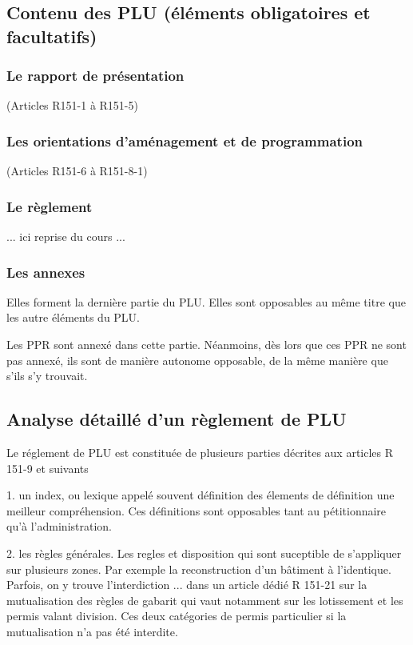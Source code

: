 	\subsection{Contenu des PLU (éléments obligatoires et facultatifs)}
	
		\subsubsection{Le rapport de présentation} (Articles R151-1 à R151-5)
		
		
		\subsubsection{Les orientations d'aménagement et de programmation} 
		(Articles R151-6 à R151-8-1)
		
		\subsubsection{Le règlement} 
		
		... ici reprise du cours ...
		
		\subsubsection{Les annexes}
		
		Elles forment la dernière partie du PLU. Elles sont opposables au même titre que les autre éléments du PLU.
		
		Les PPR sont annexé dans cette partie. Néanmoins, dès lors que ces PPR ne sont pas annexé, ils sont de manière autonome opposable, de la même manière que s'ils s'y trouvait.
	
	\subsection{Analyse détaillé d'un règlement de PLU}
		
		Le réglement de PLU est constituée de plusieurs parties décrites aux articles R 151-9 et suivants 
		
		1. un index, ou lexique appelé souvent définition des élements de définition une meilleur compréhension. Ces définitions sont opposables tant au pétitionnaire qu'à l'administration.
		
		2. les règles générales. Les regles et disposition qui sont suceptible de s'appliquer sur plusieurs zones. Par exemple la reconstruction d'un bâtiment à l'identique. Parfois, on y trouve l'interdiction ... dans un article dédié
		R 151-21 sur la mutualisation des règles de gabarit qui vaut notamment sur les lotissement et les permis valant division. Ces deux catégories de permis particulier si la mutualisation n'a pas été interdite.
		
